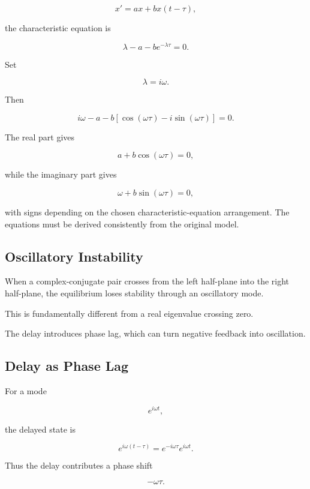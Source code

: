 \[
x'
=
ax+bx(t-\tau),
\]

the characteristic equation is

\[
\lambda-a-be^{-\lambda\tau}=0.
\]

Set

\[
\lambda=i\omega.
\]

Then

\[
i\omega
-
a
-
b
[
\cos(\omega\tau)
-
i\sin(\omega\tau)
]
=
0.
\]

The real part gives

\[
\boxed{
a
+
b\cos(\omega\tau)
=
0,
}
\]

while the imaginary part gives

\[
\boxed{
\omega
+
b\sin(\omega\tau)
=
0,
}
\]

with signs depending on the chosen characteristic-equation arrangement.
The equations must be derived consistently from the original model.

\subsection{Oscillatory Instability}
\label{subsec:dde-oscillatory-instability}

When a complex-conjugate pair crosses from the left half-plane into the
right half-plane, the equilibrium loses stability through an oscillatory
mode.

This is fundamentally different from a real eigenvalue crossing zero.

The delay introduces phase lag, which can turn negative feedback into
oscillation.

\subsection{Delay as Phase Lag}
\label{subsec:delay-phase-lag}

For a mode

\[
e^{i\omega t},
\]

the delayed state is

\[
e^{i\omega(t-\tau)}
=
e^{-i\omega\tau}
e^{i\omega t}.
\]

Thus the delay contributes a phase shift

\[
\boxed{
-\omega\tau.
}
\]

